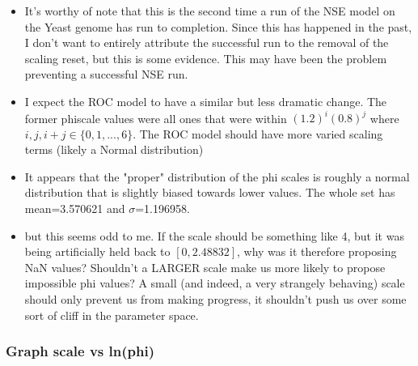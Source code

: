 \begin{itemize}
\item It's worthy of note that this is the second time a run of the NSE model on the Yeast genome has run to completion. Since this has happened in the past, I don't want to entirely attribute the successful run to the removal of the scaling reset, but this is some evidence. This may have been the problem preventing a successful NSE run.

\item I expect the ROC model to have a similar but less dramatic change. The former phiscale values were all ones that were within $(1.2)^i(0.8)^j$ where $i, j, i+j \in \{0, 1,...,6\}$. The ROC model should have more varied scaling terms (likely a Normal distribution)

\item It appears that the "proper" distribution of the phi scales is roughly a normal distribution that is slightly biased towards lower values. The whole set has mean=3.570621 and $\sigma$=1.196958.


\item but this seems odd to me. If the scale should be something like 4, but it was being artificially held back to $[0,2.48832]$, why was it therefore proposing NaN values? Shouldn't a LARGER scale make us more likely to propose impossible phi values? A small (and indeed, a very strangely behaving) scale should only prevent us from making progress, it shouldn't push us over some sort of cliff in the parameter space.
\end{itemize}


\subsubsection{Graph scale vs ln(phi)}

